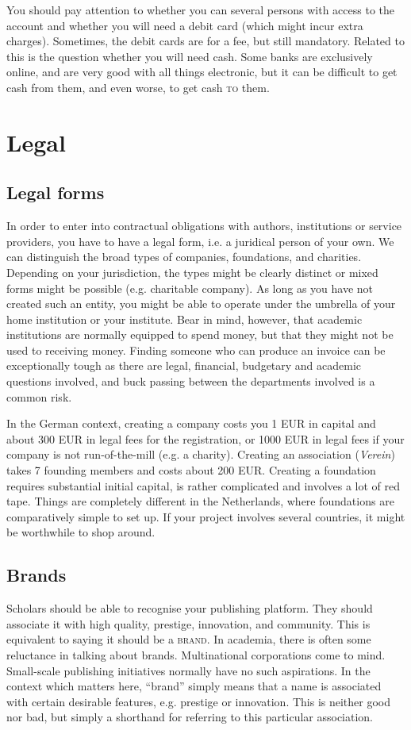\documentclass[guidelines,nonflat,modfonts] {langsci/langscibook}
\begin{document}
You should pay attention to whether you can several persons with access to the account and whether you will need a debit card (which might incur extra charges). Sometimes, the debit cards are for a fee, but still mandatory. Related to this is the question whether you will need cash. Some banks are exclusively online, and are very good with all things electronic, but it can be difficult to get cash from them, and even worse, to get cash \textsc{to} them. 


\section{Legal}\label{sec:legalform}
\subsection{Legal forms}
In order to enter into contractual obligations with authors, institutions or service providers, you have to have a legal form, i.e. a juridical person of your own. We can distinguish the broad types of companies, foundations, and charities. Depending on your jurisdiction, the types might be clearly distinct or mixed forms might be possible (e.g. charitable company). As long as you have not created such an entity, you might be able to operate under the umbrella of your home institution or your institute. Bear in mind, however, that academic institutions are normally equipped to spend money, but that they might not be used to receiving money. Finding someone who can produce an invoice can be exceptionally tough as there are legal, financial, budgetary and academic questions involved, and buck passing between the departments involved is a common risk. 

In the German context, creating a company costs you 1 EUR in capital and about 300 EUR in legal fees for the registration, or 1000 EUR in legal fees if your company is not run-of-the-mill (e.g. a charity). Creating an association (\textit{Verein}) takes 7 founding members and costs about 200 EUR. 
Creating a foundation requires substantial initial capital, is rather complicated and involves a lot of red tape. Things are completely different in the Netherlands, where foundations are comparatively simple to set up. If your project involves several countries, it might be worthwhile to shop around. 

\subsection{Brands}
Scholars should be able to recognise your publishing platform. They should associate it with high quality, prestige, innovation, and community. This is equivalent to saying it should be a \textsc{brand}. In academia, there is often some reluctance in talking about brands. Multinational corporations come to mind. Small-scale publishing initiatives normally have no such aspirations. In the context which matters here, ``brand'' simply means that a name is associated with certain desirable features, e.g. prestige or innovation. This is neither good nor bad, but simply a shorthand for referring to this particular association. 
\end{document}
